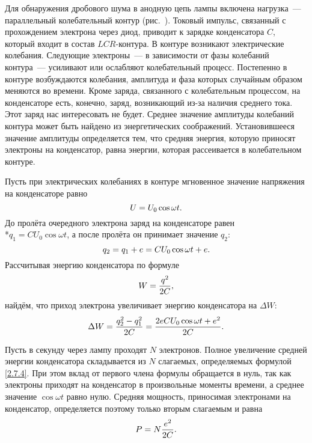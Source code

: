 Для обнаружения дробового шума в анодную цепь лампы включена
нагрузка~--- параллельный колебательный контур (рис.~).
Токовый импульс, связанный с прохождением электрона через диод, приводит к
зарядке конденсатора $C$, который входит в
состав $LCR$-контура. В контуре возникают электрические колебания. Следующие
электроны~--- в зависимости от фазы
колебаний контура~--- усиливают или ослабляют колебательный процесс. Постепенно
в контуре возбуждаются колебания, амплитуда и фаза которых случайным образом 
меняются во времени. Кроме заряда, связанного с колебательным процессом, на
конденсаторе есть, конечно, заряд, возникающий из-за наличия среднего тока. Этот
заряд нас интересовать не будет.
Среднее значение амплитуды колебаний контура может быть найдено из
энергетических соображений. Установившееся значение
амплитуды определяется тем, что средняя энергия, которую приносят электроны на
конденсатор, равна энергии, которая
рассеивается в колебательном контуре.

Пусть при электрических колебаниях в контуре мгновенное значение напряжения на
конденсаторе равно
\begin{equation}
	\eqmark{2.7.1}
	U=U_0\cos\omega t.
\end{equation}
До пролёта очередного электрона заряд на конденсаторе равен\\*$q_1 =
CU_0\cos\omega t$, а после пролёта он принимает значение
$q_2$:
\begin{equation}
	\eqmark{2.7.2}
	q_2=q_1+e=CU_0\cos\omega t+e.
\end{equation}
Рассчитывая энергию конденсатора по формуле
\begin{equation}
	\eqmark{2.7.3}
	W=\frac{q^2}{2C},
\end{equation}
найдём, что приход электрона увеличивает энергию конденсатора на $\Delta W$:
\begin{equation}
	\eqmark{2.7.4}
	\Delta W=\frac{q_2^2-q_1^2}{2C}=\frac{2eCU_0\cos\omega t+e^2}{2C}.
\end{equation}

Пусть в секунду через лампу проходят $N$ электронов. Полное увеличение средней
энергии конденсатора складывается из $N$
слагаемых, определяемых формулой \eqref{2.7.4}. При этом вклад от первого члена
формулы обращается в нуль, так как электроны
приходят на конденсатор в произвольные моменты времени, а среднее значение
$\cos\omega t$ равно нулю. Средняя мощность,
приносимая электронами на конденсатор, определяется поэтому только вторым
слагаемым и равна
\begin{equation}
	\eqmark{2.7.5}
	P=N\frac{e^2}{2C}.
\end{equation}


